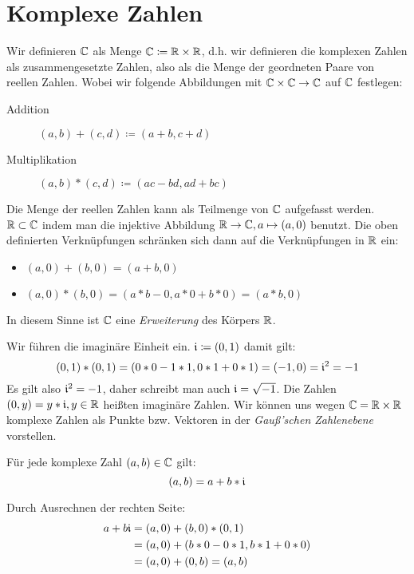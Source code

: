 \chapter{Komplexe Zahlen}
Wir definieren $\mathbb{C}$ als Menge $\mathbb{C}\coloneqq\mathbb{R}\times\mathbb{R}$, d.h. wir definieren die komplexen Zahlen als zusammengesetzte Zahlen, also als die Menge der geordneten Paare von reellen Zahlen.
Wobei wir folgende Abbildungen mit $\mathbb{C}\times\mathbb{C}\rightarrow\mathbb{C}$ auf $\mathbb{C}$ festlegen:
\begin{description}
	\item[Addition] $(a,b) + (c,d) \coloneqq (a+b,c+d)$
	\item[Multiplikation] $(a,b) * (c,d) \coloneqq (ac-bd,ad+bc)$
\end{description}

\bemerkung
Die Menge der reellen Zahlen kann als Teilmenge von $\mathbb{C}$ aufgefasst werden. $\mathbb{R}\subset\mathbb{C}$ indem man die injektive Abbildung $\mathbb{R}\rightarrow\mathbb{C}, a\mapsto (a,0)$ benutzt. Die oben definierten Verknüpfungen schränken sich dann auf die Verknüpfungen in $\mathbb{R}$ ein:
\begin{itemize}
  \item $(a,0)+(b,0)=(a+b,0)$
  \item $(a,0)*(b,0)=(a* b - 0, a* 0+ b* 0) = (a* b,0)$
\end{itemize}
In diesem Sinne ist $\mathbb{C}$ eine \emph{Erweiterung} des Körpers $\mathbb{R}$.

Wir führen die imaginäre Einheit ein.
$\mathfrak{i}\coloneqq (0,1)$ damit gilt:
\begin{equation*}
  (0,1)*(0,1) = (0*0 -1*1,0*1+0*1)=(-1,0)=\mathfrak{i}^2=-1
\end{equation*}
Es gilt also $\mathfrak{i}^2=-1$, daher schreibt man auch $\mathfrak{i}=\sqrt{-1}$. Die Zahlen $(0,y)=y*\mathfrak{i}, y\in\mathbb{R}$ heißten imaginäre Zahlen.
Wir können uns wegen $\mathbb{C}=\mathbb{R}\times\mathbb{R}$ komplexe Zahlen als Punkte bzw. Vektoren in der \emph{Gauß'schen Zahlenebene} vorstellen.

\begin{satz}{}
  Für jede komplexe Zahl $(a,b)\in\mathbb{C}$ gilt:
  \begin{equation*}
    (a,b)=a+b*\mathfrak{i}
  \end{equation*}
\end{satz}

\beweis Durch Ausrechnen der rechten Seite:
\begin{align*}
  a+b\mathfrak{i} &= (a,0)+(b,0)*(0,1)\\
  &=(a,0)+(b*0-0*1,b*1+0*0)\\
  &=(a,0)+(0,b)=(a,b)
\end{align*}

